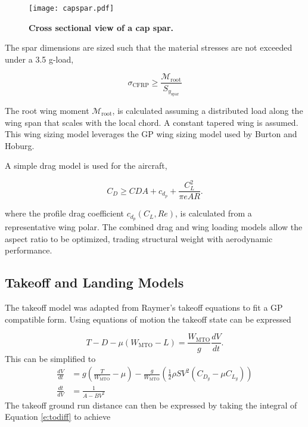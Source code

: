 \documentclass[]{aiaa-tc}%
\begin{document}
\begin{figure}[h!]
	\begin{center}
	\texttt{[image: capspar.pdf]}
    \caption{\textbf{Cross sectional view of a cap spar.}}
	\label{f:capspar}
	\end{center}
\end{figure}

The spar dimensions are sized such that the material stresses are not exceeded under a 3.5 g-load,

\begin{equation}
    \sigma_{\mathrm{CFRP}} \geq \frac{\mathcal{M}_{\mathrm{root}}}{S_{y_{\mathrm{spar}}}}
\end{equation}

The root wing moment $\mathcal{M}_{\mathrm{root}}$, is calculated assuming a distributed load along the wing span that scales with the local chord.\cite{bending}
A constant tapered wing is assumed.  
This wing sizing model leverages the GP wing sizing model used by Burton and Hoburg.\cite{burton_solar_2017} 

A simple drag model is used for the aircraft, 

\begin{equation}
    C_D \geq CDA + c_{d_p} + \frac{C_L^2}{\pi e AR}.
\end{equation}

where the profile drag coefficient $c_{d_p}(C_L, Re)$, is calculated from a representative wing polar. 
The combined drag and wing loading models allow the aspect ratio to be optimized, trading structural weight with aerodynamic performance. 

\subsection{Takeoff and Landing Models}
The takeoff model was adapted from Raymer's takeoff equations to fit a GP compatible form\cite{Raymer2006}.  Using equations of motion the takeoff state can be expressed

\begin{equation}
    T - D - \mu(W_{\mathrm{MTO}} - L) = \frac{W_{\mathrm{MTO}}}{g} \frac{dV}{dt}.
\end{equation}
This can be simplified to 
\begin{align}
    \frac{dV}{dt} &= g \left( \frac{T}{W_{\mathrm{MTO}}} - \mu \right) - \frac{g}{W_{\mathrm{MTO}}} \left( \frac{1}{2} \rho S V^2 (C_{D_g} - \mu C_{L_g})\right) \\
    \label{e:todiff}
    \frac{dt}{dV} &= \frac{1}{A-BV^2}
\end{align}
The takeoff ground run distance can then be expressed by taking the integral of Equation \ref{e:todiff} to achieve
\end{document}
